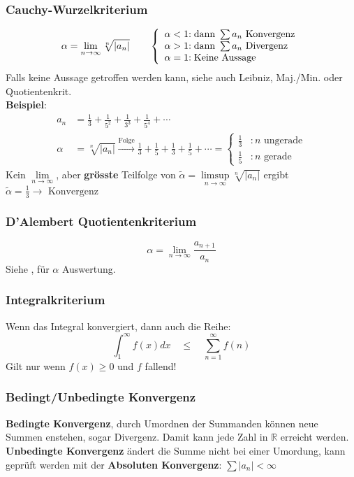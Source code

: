 \subsubsection{Cauchy-Wurzelkriterium}\label{W-Kriterium}
\[\alpha = \lim\limits_{n \rightarrow \infty}{\sqrt[n]{\left|a_n\right|}}\qquad
\left\lbrace
\begin{array}{r@{}l}
	\alpha < 1 &: \text{dann } \sum a_n \text{ Konvergenz} \\
	\alpha > 1 &: \text{dann } \sum a_n \text{ Divergenz} \\
	\alpha = 1 &: \text{Keine Aussage} \\
\end{array}\right. \]
Falls keine Aussage getroffen werden kann, siehe auch Leibniz, Maj./Min. oder Quotientenkrit.
\\
\noindent\textbf{Beispiel}:
\begin{align*}
	a_n &= \frac{1}{3} + \frac{1}{5^2} + \frac{1}{3^3} + \frac{1}{5^4} + \cdots \\
	\alpha &= \sqrt[n]{\left|a_n\right|} \xrightarrow{\text{Folge}} \frac{1}{3} + \frac{1}{5} + \frac{1}{3} + \frac{1}{5} + \cdots = \begin{cases}
		\tfrac{1}{3} &: n \text{ ungerade} \\
		\tfrac{1}{5} &: n \text{ gerade}
	\end{cases}  
\end{align*}
Kein $\lim\limits_{n\rightarrow\infty}$, aber \textbf{grösste} Teilfolge von $\tilde{\alpha} = \limsup\limits_{n\rightarrow\infty}\sqrt[n]{\left|a_n\right|}$ ergibt $\tilde{\alpha} = \tfrac{1}{3} \rightarrow \text{ Konvergenz}$

\subsubsection{D'Alembert Quotientenkriterium}
\[\alpha = \lim\limits_{n \rightarrow \infty}{\frac{a_{n+1}}{a_n}}\]
Siehe , für $\alpha$ Auswertung.

\subsubsection{Integralkriterium}
Wenn das Integral konvergiert, dann auch die Reihe:
\[\int_{1}^{\infty}f(x)dx \quad\leq\quad \sum_{n=1}^{\infty}f(n)\]
Gilt nur wenn $f(x) \geq 0$ und $f$ fallend!

\subsubsection{Bedingt/Unbedingte Konvergenz}
\textbf{Bedingte Konvergenz}, durch Umordnen der Summanden können neue Summen enstehen, sogar Divergenz. Damit kann jede Zahl in $\mathbb{R}$ erreicht werden.\\
\textbf{Unbedingte Konvergenz} ändert die Summe nicht bei einer Umordung, kann geprüft werden mit der \textbf{Absoluten Konvergenz}:
$\sum\left|a_n\right| < \infty$

